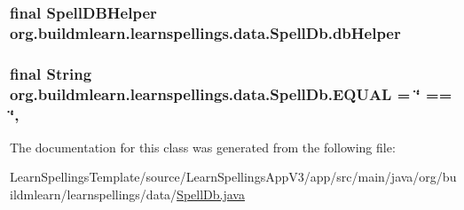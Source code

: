 \subsubsection[{\texorpdfstring{db\+Helper}{dbHelper}}]{\setlength{\rightskip}{0pt plus 5cm}final Spell\+D\+B\+Helper org.\+buildmlearn.\+learnspellings.\+data.\+Spell\+Db.\+db\+Helper\hspace{0.3cm}{\ttfamily [private]}}\hypertarget{classorg_1_1buildmlearn_1_1learnspellings_1_1data_1_1SpellDb_abd8bffa702c918c96b68933701560281}{}\label{classorg_1_1buildmlearn_1_1learnspellings_1_1data_1_1SpellDb_abd8bffa702c918c96b68933701560281}
\subsubsection[{\texorpdfstring{E\+Q\+U\+AL}{EQUAL}}]{\setlength{\rightskip}{0pt plus 5cm}final String org.\+buildmlearn.\+learnspellings.\+data.\+Spell\+Db.\+E\+Q\+U\+AL = \char`\"{} == \char`\"{}\hspace{0.3cm}{\ttfamily [static]}, {\ttfamily [private]}}\hypertarget{classorg_1_1buildmlearn_1_1learnspellings_1_1data_1_1SpellDb_a149f2ab06e708fe75bff9fa8e60876d6}{}\label{classorg_1_1buildmlearn_1_1learnspellings_1_1data_1_1SpellDb_a149f2ab06e708fe75bff9fa8e60876d6}


The documentation for this class was generated from the following file\+:\begin{DoxyCompactItemize}
\item 
Learn\+Spellings\+Template/source/\+Learn\+Spellings\+App\+V3/app/src/main/java/org/buildmlearn/learnspellings/data/\hyperlink{SpellDb_8java}{Spell\+Db.\+java}\end{DoxyCompactItemize}
